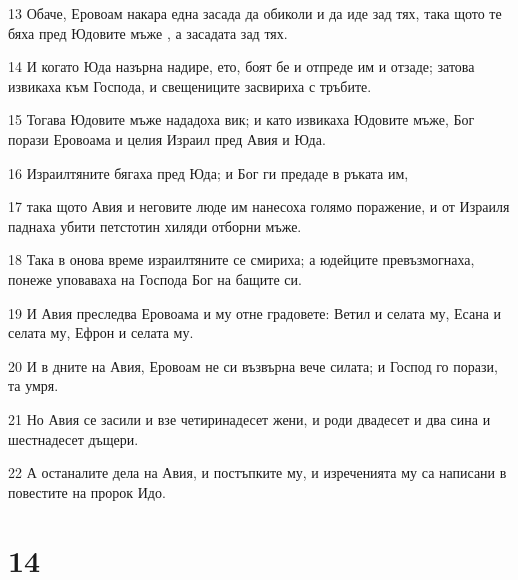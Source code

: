 \par 13 Обаче, Еровоам накара една засада да обиколи и да иде зад тях, така щото те бяха пред Юдовите мъже , а засадата зад тях.
\par 14 И когато Юда назърна надире, ето, боят бе и отпреде им и отзаде; затова извикаха към Господа, и свещениците засвириха с тръбите.
\par 15 Тогава Юдовите мъже нададоха вик; и като извикаха Юдовите мъже, Бог порази Еровоама и целия Израил пред Авия и Юда.
\par 16 Израилтяните бягаха пред Юда; и Бог ги предаде в ръката им,
\par 17 така щото Авия и неговите люде им нанесоха голямо поражение, и от Израиля паднаха убити петстотин хиляди отборни мъже.
\par 18 Така в онова време израилтяните се смириха; а юдейците превъзмогнаха, понеже уповаваха на Господа Бог на бащите си.
\par 19 И Авия преследва Еровоама и му отне градовете: Ветил и селата му, Есана и селата му, Ефрон и селата му.
\par 20 И в дните на Авия, Еровоам не си възвърна вече силата; и Господ го порази, та умря.
\par 21 Но Авия се засили и взе четиринадесет жени, и роди двадесет и два сина и шестнадесет дъщери.
\par 22 А останалите дела на Авия, и постъпките му, и изреченията му са написани в повестите на пророк Идо.

\chapter{14}

